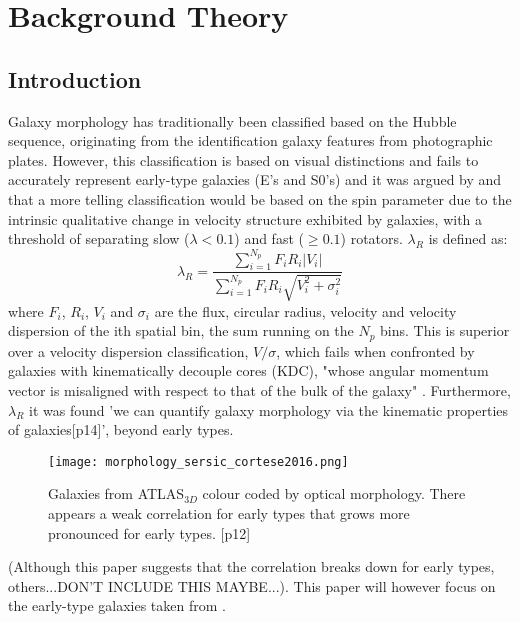
\chapter{Background Theory}

\label{ch:background}

\section{Introduction}
Galaxy morphology has traditionally been classified based on the Hubble sequence, originating from the identification galaxy features from photographic plates. However, this classification is based on visual distinctions and fails to accurately represent early-type galaxies (E's and S0's) and it was argued by \cite{Cappellari2011} and \cite{Emsellem2011} that a more telling classification would be based on the spin parameter due to the intrinsic qualitative change in velocity structure exhibited by galaxies, with a threshold of separating slow ($\lambda<0.1$) and fast ($\geq0.1$) rotators. $\lambda_{R}$ is defined as\cite{sauron9}:
\begin{equation}
\lambda_{R} = \frac{\sum_{i=1}^{N_{p}} F_{i}R_{i}|V_{i}|}{\sum_{i=1}^{N_{p}}F_{i}R_{i}\sqrt{V_{i}^2+\sigma_{i}^2}}
\end{equation}
where $F_i$, $R_i$, $V_i$ and $σ_i$ are the flux, circular radius, velocity and velocity dispersion of the ith spatial bin, the sum running on the $N_p$ bins.
This is superior over a velocity dispersion classification, $V/\sigma$, which fails when confronted by galaxies with kinematically decouple cores (KDC), "whose angular momentum vector is misaligned with respect to that of the bulk of the galaxy" \cite{mo_bosch_white_2010}. Furthermore, $\lambda_{R}$ it was found 'we can quantify galaxy morphology via the kinematic properties of galaxies\cite{Cortese2016}[p14]', beyond early types. 
\begin{figure}[h]
	\caption{Galaxies from ATLAS$_{3D}$ colour coded by optical morphology. There appears a weak correlation for early types that grows more pronounced for early types.	
		 \cite{Cortese2016}[p12]}
	\centering
	\texttt{[image: morphology\_sersic\_cortese2016.png]}
\end{figure}

(Although this paper suggests that the correlation breaks down for early types, others...DON'T INCLUDE THIS MAYBE...). This paper will however focus on the early-type galaxies taken from \cite{Emsellem2011}. 

